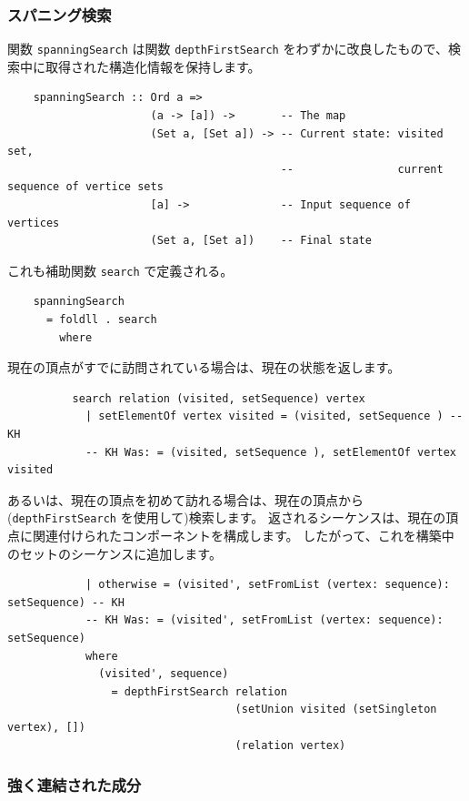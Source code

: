 \documentclass{jbook}
\begin{document}
\subsubsection*{スパニング検索}

関数 \texttt{spanningSearch} は関数 \texttt{depthFirstSearch} をわずかに改良したもので、検索中に取得された構造化情報を保持します。

\begin{verbatim}
	spanningSearch :: Ord a =>
	                  (a -> [a]) ->       -- The map
	                  (Set a, [Set a]) -> -- Current state: visited set,
	                                      --                current sequence of vertice sets
	                  [a] ->              -- Input sequence of vertices
	                  (Set a, [Set a])    -- Final state
\end{verbatim}

これも補助関数 \texttt{search} で定義される。

\begin{verbatim}
	spanningSearch
	  = foldll . search
	    where
\end{verbatim}

現在の頂点がすでに訪問されている場合は、現在の状態を返します。

\begin{verbatim}
	      search relation (visited, setSequence) vertex
	        | setElementOf vertex visited = (visited, setSequence ) -- KH
	        -- KH Was: = (visited, setSequence ), setElementOf vertex visited
\end{verbatim}

あるいは、現在の頂点を初めて訪れる場合は、現在の頂点から(\texttt{depthFirstSearch} を使用して)検索します。
返されるシーケンスは、現在の頂点に関連付けられたコンポーネントを構成します。
したがって、これを構築中のセットのシーケンスに追加します。

\begin{verbatim}
	        | otherwise = (visited', setFromList (vertex: sequence): setSequence) -- KH
	        -- KH Was: = (visited', setFromList (vertex: sequence): setSequence)
	        where
	          (visited', sequence)
	            = depthFirstSearch relation
	                               (setUnion visited (setSingleton vertex), [])
	                               (relation vertex)
\end{verbatim}

\subsubsection*{強く連結された成分}
\end{document}

